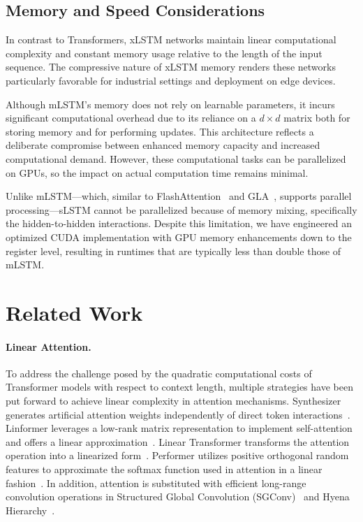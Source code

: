\subsection{Memory and Speed Considerations}

In contrast to Transformers, xLSTM networks maintain linear computational complexity and constant memory usage relative to the length of the input sequence. The compressive nature of xLSTM memory renders these networks particularly favorable for industrial settings and deployment on edge devices.

Although mLSTM's memory does not rely on learnable parameters, it incurs significant computational overhead due to its reliance on a $d \times d$ matrix both for storing memory and for performing updates. This architecture reflects a deliberate compromise between enhanced memory capacity and increased computational demand. However, these computational tasks can be parallelized on GPUs, so the impact on actual computation time remains minimal.

Unlike mLSTM—which, similar to FlashAttention~\citep{Dao:22,Dao:23} and GLA~\citep{Yang:23arxiv}, supports parallel processing—sLSTM cannot be parallelized because of memory mixing, specifically the hidden-to-hidden interactions. Despite this limitation, we have engineered an optimized CUDA implementation with GPU memory enhancements down to the register level, resulting in runtimes that are typically less than double those of mLSTM.

\section{Related Work}
\label{sec:related}

\paragraph{Linear Attention.} To address the challenge posed by the quadratic computational costs of Transformer models with respect to context length, multiple strategies have been put forward to achieve linear complexity in attention mechanisms. Synthesizer generates artificial attention weights independently of direct token interactions~\citep{Tay:20arxiv}. Linformer leverages a low-rank matrix representation to implement self-attention and offers a linear approximation~\citep{Wang:20arxiv}. Linear Transformer transforms the attention operation into a linearized form~\citep{Katharopoulos:20}. Performer utilizes positive orthogonal random features to approximate the softmax function used in attention in a linear fashion~\citep{Choromanski:21}. In addition, attention is substituted with efficient long-range convolution operations in Structured Global Convolution (SGConv)~\citep{Li:22} and Hyena Hierarchy~\citep{Poli:23}.

